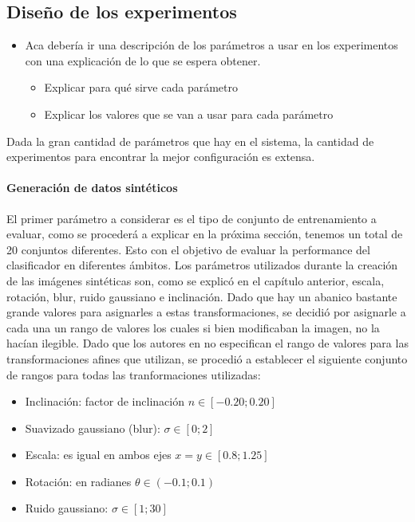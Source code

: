 \subsection{Diseño de los experimentos}

	\begin{itemize}
		\item Aca debería ir una descripción de los parámetros a usar en los experimentos con una explicación de lo que se espera obtener.
		\begin{itemize}
			\item Explicar para qué sirve cada parámetro
			\item Explicar los valores que se van a usar para cada parámetro
		\end{itemize}
	\end{itemize}

	Dada la gran cantidad de parámetros que hay en el sistema, la cantidad de experimentos para encontrar la mejor configuración es extensa.

        \paragraph{Generación de datos sintéticos}

	El primer parámetro a considerar es el tipo de conjunto de entrenamiento a evaluar, como se procederá a explicar en la próxima sección, tenemos un total de 20 conjuntos diferentes. Esto con el objetivo de evaluar la performance del clasificador en diferentes ámbitos. Los parámetros utilizados durante la creación de las imágenes sintéticas son, como se explicó en el capítulo anterior, escala, rotación, blur, ruido gaussiano e inclinación. Dado que hay un abanico bastante grande valores para asignarles a estas transformaciones, se decidió por asignarle a cada una un rango de valores los cuales si bien modificaban la imagen, no la hacían ilegible. Dado que los autores en \cite{wang} no especifican el rango de valores para las transformaciones afines que utilizan, se procedió a establecer el siguiente conjunto de rangos para todas las tranformaciones utilizadas:
	
	\begin{itemize}
		\item Inclinación: factor de inclinación $n \in [-0.20 ; 0.20]$
		\item Suavizado gaussiano (blur): $\sigma \in [0 ; 2]$
		\item Escala: es igual en ambos ejes $x=y \in [0.8; 1.25]$
		\item Rotación: en radianes $\theta \in (-0.1; 0.1)$
		\item Ruido gaussiano: $\sigma \in [1; 30]$
	\end{itemize}
	
